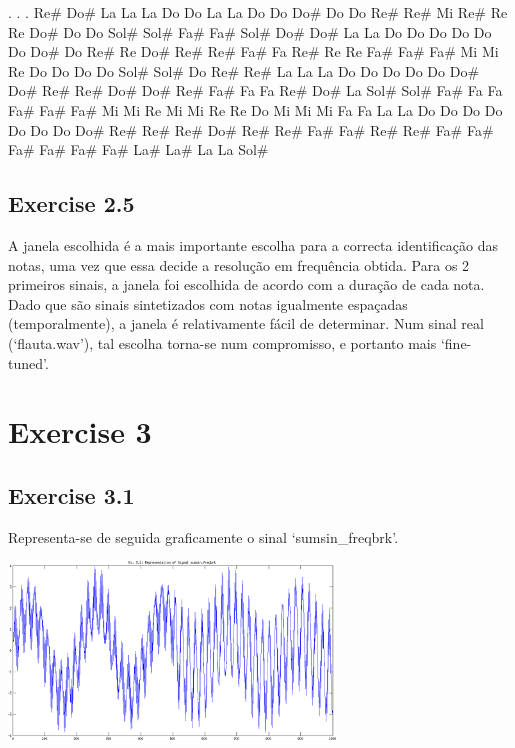 \documentclass[a4paper]{article}
\begin{document}
. . . Re\# Do\# La La La Do Do La La Do Do Do\# Do Do Re\# Re\# Mi Re\# Re Re Do\# Do Do Sol\# Sol\# Fa\# Fa\# Sol\# Do\# Do\# La La Do Do Do Do Do Do Do\# Do Re\# Re Do\# Re\# Re\# Fa\# Fa Re\# Re Re Fa\# Fa\# Fa\# Mi Mi Re Do Do Do Do Sol\# Sol\# Do Re\# Re\# La La La Do Do Do Do Do Do\# Do\# Re\# Re\# Do\# Do\# Re\# Fa\# Fa Fa Re\# Do\# La Sol\# Sol\# Fa\# Fa Fa Fa\# Fa\# Fa\# Mi Mi Re Mi Mi Re Re Do Mi Mi Mi Fa Fa La La Do Do Do Do Do Do Do Do\# Re\# Re\# Re\# Do\# Re\# Re\# Fa\# Fa\# Re\# Re\# Fa\# Fa\# Fa\# Fa\# Fa\# Fa\# La\# La\# La La Sol\# 

\subsection{Exercise 2.5}
\indent \indent A janela escolhida é a mais importante escolha para a correcta identificação das notas, uma vez que essa decide a resolução em frequência obtida. Para os 2 primeiros sinais, a janela foi escolhida de acordo com a duração de cada nota. Dado que são sinais sintetizados com notas igualmente espaçadas (temporalmente), a janela é relativamente fácil de determinar. Num sinal real (`flauta.wav'), tal escolha torna-se num compromisso, e portanto mais `fine-tuned'.

\clearpage

\section{Exercise 3}
\subsection{Exercise 3.1}
\indent \indent Representa-se de seguida graficamente o sinal `sumsin\_freqbrk'.
\begin{center}
	\includegraphics[width=0.65\textwidth]{images/ex_3_1.png}
\end{center}
\end{document}
